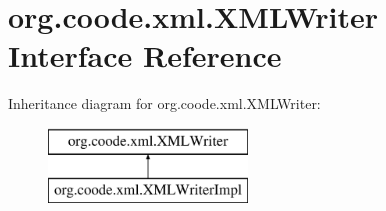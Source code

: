 \hypertarget{interfaceorg_1_1coode_1_1xml_1_1_x_m_l_writer}{\section{org.\-coode.\-xml.\-X\-M\-L\-Writer Interface Reference}
\label{interfaceorg_1_1coode_1_1xml_1_1_x_m_l_writer}
}
Inheritance diagram for org.\-coode.\-xml.\-X\-M\-L\-Writer\-:\begin{figure}[H]
\begin{center}
\leavevmode
\includegraphics[height=2.000000cm]{interfaceorg_1_1coode_1_1xml_1_1_x_m_l_writer}
\end{center}
\end{figure}
